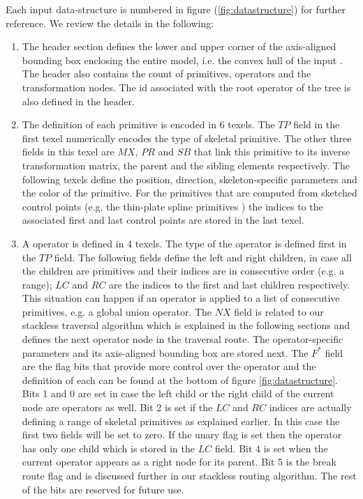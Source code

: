 Each input data-structure is numbered in figure (\ref{fig:datastructure}) for further reference. We review the details in the following:
\begin{enumerate}
 \item The header section defines the lower and upper corner of the axis-aligned bounding box enclosing the entire model, 
 i.e. the convex hull of the input \blob. The header also contains the count of primitives, operators and the transformation 
 nodes. The id associated with the root operator of the tree is also defined in the header.
 
 \item The definition of each primitive is encoded in 6 texels. The $TP$ field in the first texel numerically encodes the 
 type of skeletal primitive. The other three fields in this texel are $MX$, $PR$ and $SB$ that link this primitive to its inverse 
 transformation matrix, the parent and the sibling elements respectively. The following texels define the position, 
 direction, skeleton-specific parameters and the color of the primitive. For the primitives that are 
 computed from sketched control points (e.g. the thin-plate spline primitives \cite{Turk1999, Grasberger}) the indices to the 
 associated first and last control points are stored in the last texel.

 \item A \blob operator is defined in 4 texels. The type of the operator is defined first in the $TP$ field. 
 The following fields define the left and right children, in case all the children are primitives and their indices are in 
 consecutive order (e.g. a range); $LC$ and $RC$ are the indices to the first and last children respectively. This situation 
 can happen if an operator is applied to a list of consecutive primitives, e.g. a global union operator.  The $NX$ 
 field is related to our stackless \blob traversal algorithm which is explained in the following sections and defines the next 
 operator node in the \blob traversal route. The operator-specific parameters and its axis-aligned bounding box are stored next. 
 The $F^*$ field are the flag bits that provide more control over the operator and the definition of each can be found at the bottom of figure
 \ref{fig:datastructure}. Bits 1 and 0 are set in case the left child or the right child of the current node are operators as well. Bit 2 is 
 set if the $LC$ and $RC$ indices are actually defining a range of skeletal primitives as explained earlier. In this case the 
 first two fields will be set to zero. If the unary flag is set then the operator has only one child which is stored in the $LC$ field.  
 Bit 4 is set when the current operator appears as a right node for its parent. Bit 5 is the break route flag and is discussed further 
 in our stackless \blob routing algorithm. The rest of the bits are reserved for future use. 
 

\end{enumerate}

